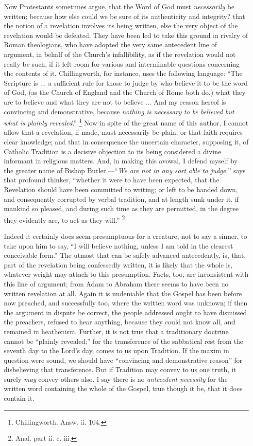 Now Protestants sometimes argue, that the Word of God must \emph{necessarily}
be written; because how else could we be sure of its authenticity and
integrity? that the notion of a revelation involves its being written,
else the very object of the revelation would be defeated. They have
been led to take this ground in rivalry of Roman theologians, who have
adopted the very same antecedent line of argument, in behalf of the
Church's infallibility, as if the revelation would not really be such,
if it left room for various and interminable questions concerning the
contents of it. Chillingworth, for instance, uses the following
language: ``The Scripture is ... a sufficient rule for those to
judge by who believe it to be the word of God, (as the Church of
England and the Church of Rome both do,) what they are to believe and
what they are not to believe ... And my reason hereof is convincing
and demonstrative, because \emph{nothing is necessary to be believed but
what is plainly revealed}.'' \footnote{Chillingworth, Answ. ii. 104.} Now in spite of the great name of this author, I cannot allow
that a revelation, if made, must necessarily be plain, or that
faith requires clear knowledge; and that in consequence the uncertain
character, supposing it, of Catholic Tradition is a decisive objection
to its being considered a divine informant in religious matters. And,
in making this avowal, I defend myself by the greater name of Bishop
Butler.—``\emph{We are not in any sort able to judge},''
says that profound thinker, ``whether it were to have been
expected, that the Revelation should have been committed to writing;
or left to be handed down, and consequently corrupted by verbal
tradition, and at length sunk under it, if mankind so pleased, and
during such time as they are permitted, in the degree they evidently
are, to act as they will.'' \footnote{Anal. part ii. c. iii.}

Indeed it certainly does seem presumptuous for a creature, not to
say a sinner, to take upon him to say, ``I will believe nothing,
unless I am told in the clearest conceivable form.'' The utmost
that can be safely advanced antecedently, is, that, part of the
revelation being confessedly written, it is likely that the whole is,
whatever weight may attach to this presumption. Facts, too, are
inconsistent with this line of argument; from Adam to Abraham there
seems to have been no written revelation at all. Again it is
undeniable that the Gospel has been before now preached, and
successfully too, where the written word was unknown; if then the
argument in dispute be correct, the people addressed ought to have
dismissed the preachers, refused to hear anything, because they could
not know all, and remained in heathenism. Further, it is not true that
a traditionary doctrine cannot be ``plainly revealed;'' for
the transference of the sabbatical rest from the seventh day to the
Lord's day, comes to us upon Tradition. If the maxim in question were
sound, we should have ``convincing and demonstrative reason'' for disbelieving that transference. But if Tradition may
convey to us one truth, it surely \emph{may} convey others also. I say
there is no \emph{antecedent necessity} for the written word
containing the whole of the Gospel, true though it be, that it does
contain it.

